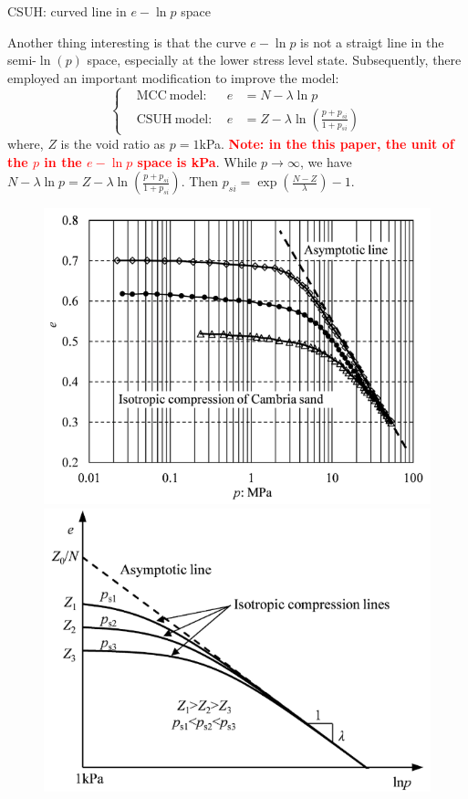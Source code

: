 \documentclass[aspectratio=169]{beamer}
\begin{document}
\begin{frame}{CSUH: curved line in $e-\ln{p}$ space}
    \fontsize{12}{13}\selectfont
    \begin{minipage}{0.62\linewidth}
        Another thing interesting is that the curve $e-\ln{p}$ is not a straigt line in the semi-$\ln{(p)}$ space, especially at the lower stress level state. Subsequently, there employed an important modification to improve the model:
        \begin{equation}
            \left\{\begin{aligned}
                &\mathrm{MCC\  model:}\  &e& = N-\lambda\ln{p}\\
                &\mathrm{CSUH\  model:}\  &e& = Z-\lambda\ln{\left(\frac{p+p_{si}}{1+p_{si}} \right)}
            \end{aligned}\right.
        \end{equation}
        where, $Z$ is the void ratio as $p=1$\si{kPa}. \textcolor{red}{\textbf{Note: in the this paper, the unit of the $p$ in the $e-\ln{p}$ space is \si{kPa}}}. While $p\rightarrow \infty $, we have $N-\lambda\ln{p}= Z-\lambda\ln{\left(\frac{p+p_{si}}{1+p_{si}} \right)}$. Then $p_{si} = \exp{\left( \frac{N-Z}{\lambda}\right)}-1$.
    \end{minipage}
    \hspace{2mm}
    \begin{minipage}{0.33\linewidth}
        \begin{figure}
            \centering
            \includegraphics[width=0.85\linewidth]{./pic/Isotropic compression of Cambria sand.jpg}
            \includegraphics[width=0.85\linewidth]{./pic/different z.jpg}

\end{figure}
\end{minipage}
\end{frame}
\end{document}
